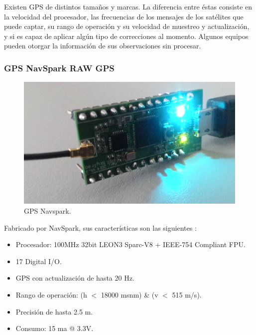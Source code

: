 Existen GPS de distintos tamaños y marcas. La diferencia entre éstas consiste en la velocidad del procesador, las frecuencias de los mensajes de los satélites que puede captar, su rango de operación y su velocidad de muestreo y actualización, y si es capaz de aplicar algún tipo de correcciones al momento. Algunos equipos pueden otorgar la información de sus observaciones sin procesar.

\subsubsection{GPS NavSpark RAW GPS}

\begin{figure}[H]
\centering
\includegraphics[scale=0.19]{Figures/NavGPS}
\caption[GPS Navspark.]{GPS Navspark.}
\label{fig:nsraw}
\end{figure}

Fabricado por NavSpark, sus características son las siguientes \citep{nsraw}:

\begin{itemize}
\item Procesador: 100MHz 32bit LEON3 Sparc-V8 + IEEE-754 Compliant FPU.
\item 17 Digital I/O.\\
\item GPS con actualización de hasta 20 Hz.\\
\item Rango de operación: (h $<$ 18000 msnm) \& (v $<$ 515 m/s).\\
\item Precisión de hasta 2.5 m.\\
\item Consumo: 15 ma @ 3.3V.\\
\end{itemize}


